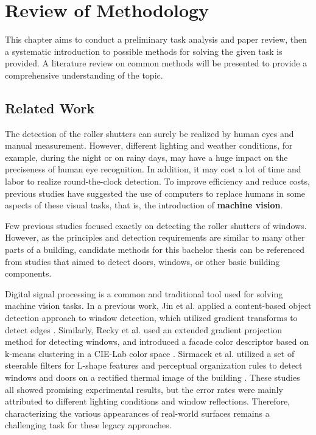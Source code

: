 \chapter{Review of Methodology}

This chapter aims to conduct a preliminary task analysis and paper review, then a systematic introduction to possible methods for solving the given task is provided. A literature review on common methods will be presented to provide a comprehensive understanding of the topic.

\section{Related Work}

The detection of the roller shutters can surely be realized by human eyes and manual measurement. However, different lighting and weather conditions, for example, during the night or on rainy days, may have a huge impact on the preciseness of human eye recognition. In addition, it may cost a lot of time and labor to realize round-the-clock detection. To improve efficiency and reduce costs, previous studies have suggested the use of computers to replace humans in some aspects of these visual tasks, that is, the introduction of \textbf{machine vision}.

Few previous studies focused exactly on detecting the roller shutters of windows. However, as the principles and detection requirements are similar to many other parts of a building, candidate methods for this bachelor thesis can be referenced from studies that aimed to detect doors, windows, or other basic building components.

Digital signal processing is a common and traditional tool used for solving machine vision tasks. In a previous work, Jin et al. applied a content-based object detection approach to window detection, which utilized gradient transforms to detect edges \cite{jin2001content}. Similarly, Recky et al. used an extended gradient projection method for detecting windows, and introduced a facade color descriptor based on k-means clustering in a CIE-Lab color space \cite{recky2010windows}. Sirmacek et al. utilized a set of steerable filters for L-shape features and perceptual organization rules to detect windows and doors on a rectified thermal image of the building \cite{sirmacek2011detection}. These studies all showed promising experimental results, but the error rates were mainly attributed to different lighting conditions and window reflections. Therefore, characterizing the various appearances of real-world surfaces remains a challenging task for these legacy approaches. 

